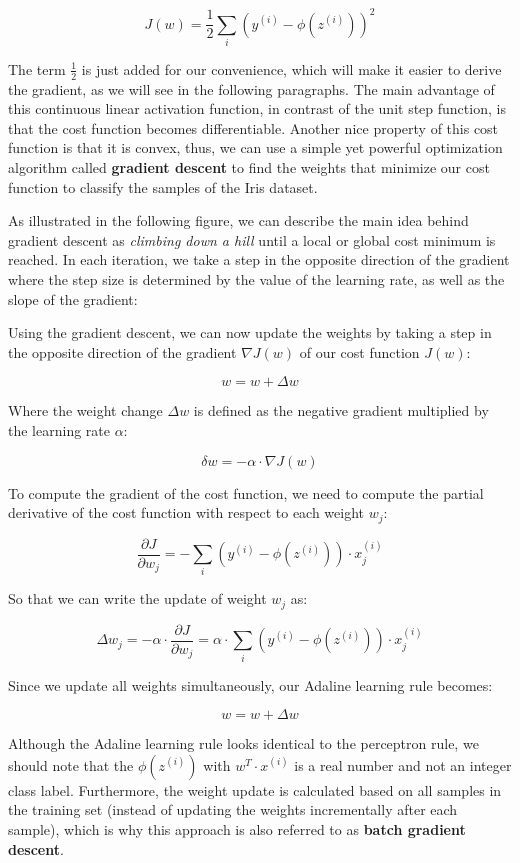 \documentclass[11pt]{article}
\begin{document}
\[J(w) = \frac{1}{2}\sum_{i}(y^{(i)} - \phi(z^{(i)}))^2\]

The term \(\frac{1}{2}\) is just added for our convenience, which will
make it easier to derive the gradient, as we will see in the following
paragraphs. The main advantage of this continuous linear activation
function, in contrast of the unit step function, is that the cost
function becomes differentiable. Another nice property of this cost
function is that it is convex, thus, we can use a simple yet powerful
optimization algorithm called \textbf{gradient descent} to find the
weights that minimize our cost function to classify the samples of the
Iris dataset.

As illustrated in the following figure, we can describe the main idea
behind gradient descent as \emph{climbing down a hill} until a local or
global cost minimum is reached. In each iteration, we take a step in the
opposite direction of the gradient where the step size is determined by
the value of the learning rate, as well as the slope of the gradient:

    Using the gradient descent, we can now update the weights by taking a
step in the opposite direction of the gradient \(\nabla J(w)\) of our
cost function \(J(w):\)

\[w = w + \Delta w\]

Where the weight change \(\Delta w\) is defined as the negative gradient
multiplied by the learning rate \(\alpha\):

\[\delta w = -\alpha \cdot \nabla J(w)\]

    To compute the gradient of the cost function, we need to compute the
partial derivative of the cost function with respect to each weight
\(w_j\):

\[\frac{\partial J}{\partial w_j} = -\sum_{i}(y^{(i)} - \phi(z^{(i)})) \cdot x^{(i)}_j\]

So that we can write the update of weight \(w_j\) as:

\[\Delta w_j = -\alpha \cdot \frac{\partial J}{\partial w_j} = \alpha \cdot \sum_{i}(y^{(i)} - \phi(z^{(i)})) \cdot x^{(i)}_j\]

Since we update all weights simultaneously, our Adaline learning rule
becomes:

\[w = w + \Delta w\]

    Although the Adaline learning rule looks identical to the perceptron
rule, we should note that the \(\phi(z^{(i)})\) with
\(w^T \cdot x^{(i)}\) is a real number and not an integer class label.
Furthermore, the weight update is calculated based on all samples in the
training set (instead of updating the weights incrementally after each
sample), which is why this approach is also referred to as \textbf{batch
gradient descent}.
\end{document}
